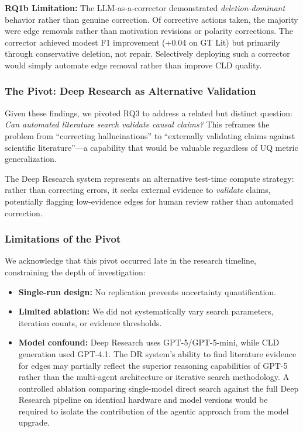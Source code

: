 \textbf{RQ1b Limitation:} The LLM-as-a-corrector demonstrated \textit{deletion-dominant} behavior rather than genuine correction. Of corrective actions taken, the majority were edge removals rather than motivation revisions or polarity corrections. The corrector achieved modest F1 improvement (+0.04 on GT Lit) but primarily through conservative deletion, not repair. Selectively deploying such a corrector would simply automate edge removal rather than improve CLD quality.

\subsubsection{The Pivot: Deep Research as Alternative Validation}

Given these findings, we pivoted RQ3 to address a related but distinct question: \textit{Can automated literature search validate causal claims?} This reframes the problem from ``correcting hallucinations'' to ``externally validating claims against scientific literature''---a capability that would be valuable regardless of UQ metric generalization.

The Deep Research system represents an alternative test-time compute strategy: rather than correcting errors, it seeks external evidence to \textit{validate} claims, potentially flagging low-evidence edges for human review rather than automated correction.

\subsubsection{Limitations of the Pivot}

We acknowledge that this pivot occurred late in the research timeline, constraining the depth of investigation:

\begin{itemize}[noitemsep]
    \item \textbf{Single-run design:} No replication prevents uncertainty quantification.
    \item \textbf{Limited ablation:} We did not systematically vary search parameters, iteration counts, or evidence thresholds.
    \item \textbf{Model confound:} Deep Research uses GPT-5/GPT-5-mini, while CLD generation used GPT-4.1. The DR system's ability to find literature evidence for edges may partially reflect the superior reasoning capabilities of GPT-5 rather than the multi-agent architecture or iterative search methodology. A controlled ablation comparing single-model direct search against the full Deep Research pipeline on identical hardware and model versions would be required to isolate the contribution of the agentic approach from the model upgrade.
\end{itemize}

